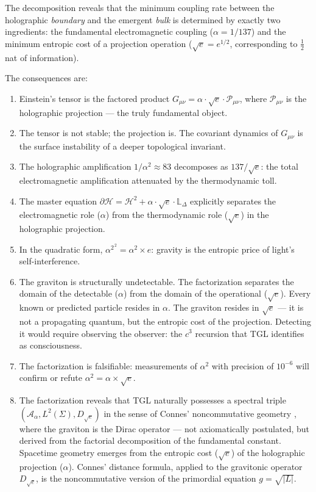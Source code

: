 \documentclass[12pt,a4paper,twoside]{article}
\newcommand{\alphaii}{\alpha^{2}}
\newcommand{\boundary}{\textit{boundary}}
\newcommand{\bulk}{\textit{bulk}}
\begin{document}
The decomposition reveals that the minimum coupling rate between the holographic \boundary{} and the emergent \bulk{} is determined by exactly two ingredients: the fundamental electromagnetic coupling ($\alpha = 1/137$) and the minimum entropic cost of a projection operation ($\sqrt{e} = e^{1/2}$, corresponding to $\frac{1}{2}$ nat of information).

The consequences are:

\begin{enumerate}[label=(\roman*)]
\item Einstein's tensor is the factored product $G_{\mu\nu} = \alpha \cdot \sqrt{e} \cdot \mathcal{P}_{\mu\nu}$, where $\mathcal{P}_{\mu\nu}$ is the holographic projection --- the truly fundamental object.

\item The tensor is not stable; the projection is. The covariant dynamics of $G_{\mu\nu}$ is the surface instability of a deeper topological invariant.

\item The holographic amplification $1/\alphaii \approx 83$ decomposes as $137/\sqrt{e}$: the total electromagnetic amplification attenuated by the thermodynamic toll.

\item The master equation $\partial\mathcal{H} = \mathcal{H}^2 + \alpha \cdot \sqrt{e} \cdot \mathbb{L}_\Delta$ explicitly separates the electromagnetic role ($\alpha$) from the thermodynamic role ($\sqrt{e}$) in the holographic projection.

\item In the quadratic form, $\alphaii^{\,2} = \alpha^2 \times e$: gravity is the entropic price of light's self-interference.

\item The graviton is structurally undetectable. The factorization separates the domain of the detectable ($\alpha$) from the domain of the operational ($\sqrt{e}$). Every known or predicted particle resides in $\alpha$. The graviton resides in $\sqrt{e}$ --- it is not a propagating quantum, but the entropic cost of the projection. Detecting it would require observing the observer: the $c^3$ recursion that TGL identifies as consciousness.

\item The factorization is falsifiable: measurements of $\alphaii$ with precision of $10^{-6}$ will confirm or refute $\alphaii = \alpha \times \sqrt{e}$.

\item The factorization reveals that TGL naturally possesses a spectral triple $(\mathcal{A}_\alpha, L^2(\Sigma), D_{\sqrt{e}})$ in the sense of Connes' noncommutative geometry \cite{Connes1994, Connes1996}, where the graviton is the Dirac operator --- not axiomatically postulated, but derived from the factorial decomposition of the fundamental constant. Spacetime geometry emerges from the entropic cost ($\sqrt{e}$) of the holographic projection ($\alpha$). Connes' distance formula, applied to the gravitonic operator $D_{\sqrt{e}}$, is the noncommutative version of the primordial equation $g = \sqrt{|L|}$.
\end{enumerate}
\end{document}
